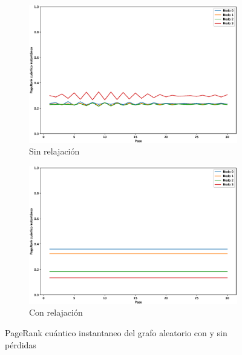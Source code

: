 \begin{figure}[H]
    \centering
    \begin{subfigure}[m]{0.45\textwidth}
        \centering
        \includegraphics[width=0.9\linewidth]{img/crown-inst-lossless.eps}
        \caption{Sin relajación}
    \end{subfigure}
    \begin{subfigure}[m]{0.45\textwidth}
        \centering
        \includegraphics[width=0.9\linewidth]{img/crown-inst-lossy.eps}
        \caption{Con relajación}
    \end{subfigure}
    \caption[PageRank cuántico instantaneo del grafo aleatorio con y sin pérdidas]{PageRank cuántico instantaneo del grafo aleatorio con y sin pérdidas}
    \label{fig:instcrownlossy}
\end{figure}


